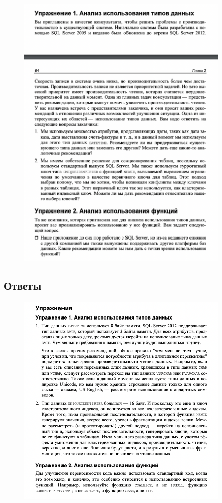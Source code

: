\begin{figure}[h!]
	\begin{center}
		\includegraphics[width=0.9\textwidth]{img/ex2.png}
	\end{center}
	\captionsetup{justification=centering}
\end{figure}
\clearpage
\subsection*{Ответы}

\begin{figure}[h!]
	\begin{center}
		\includegraphics[width=0.9\textwidth]{img/eans2.png}
	\end{center}
	\captionsetup{justification=centering}
\end{figure}